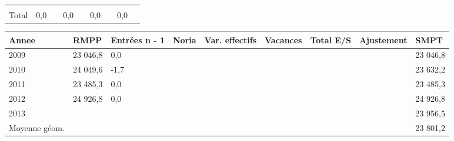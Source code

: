 \begin{longtable}[]{@{}lllllllll@{}}
\begin{minipage}[t]{0.06\columnwidth}
\strut
\end{minipage} & \begin{minipage}[t]{0.13\columnwidth}\raggedright
\strut
\end{minipage} & \begin{minipage}[t]{0.06\columnwidth}\raggedright
\strut
\end{minipage} & \begin{minipage}[t]{0.05\columnwidth}\raggedright
\strut
\end{minipage} & \begin{minipage}[t]{0.06\columnwidth}\raggedright
\strut
\end{minipage}\tabularnewline
\begin{minipage}[t]{0.05\columnwidth}\raggedright
Total\strut
\end{minipage} & \begin{minipage}[t]{0.10\columnwidth}\raggedright
0,0\strut
\end{minipage} & \begin{minipage}[t]{0.06\columnwidth}\raggedright
\strut
\end{minipage} & \begin{minipage}[t]{0.17\columnwidth}\raggedright
0,0\strut
\end{minipage} & \begin{minipage}[t]{0.06\columnwidth}\raggedright
\strut
\end{minipage} & \begin{minipage}[t]{0.13\columnwidth}\raggedright
0,0\strut
\end{minipage} & \begin{minipage}[t]{0.06\columnwidth}\raggedright
\strut
\end{minipage} & \begin{minipage}[t]{0.05\columnwidth}\raggedright
0,0\strut
\end{minipage} & \begin{minipage}[t]{0.06\columnwidth}\raggedright
\strut
\end{minipage}\tabularnewline
\bottomrule
\end{longtable}

\begin{longtable}[]{@{}lllllllll@{}}
\toprule
Annee & RMPP & Entrées n - 1 & Noria & Var. effectifs & Vacances & Total
E/S & Ajustement & SMPT\tabularnewline
\midrule
\endhead
2009 & 23 046,8 & 0,0 & & & & & & 23 046,8\tabularnewline
2010 & 24 049,6 & -1,7 & & & & & & 23 632,2\tabularnewline
2011 & 23 485,3 & 0,0 & & & & & & 23 485,3\tabularnewline
2012 & 24 926,8 & 0,0 & & & & & & 24 926,8\tabularnewline
2013 & & & & & & & & 23 956,5\tabularnewline
Moyenne géom. & & & & & & & & 23 801,2\tabularnewline
\bottomrule
\end{longtable}

